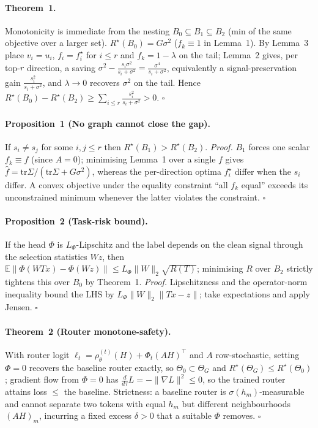 \documentclass[letterpaper]{article}
\begin{document}
\paragraph{Theorem~1.} Monotonicity is immediate from the nesting $B_0\subseteq B_1\subseteq B_2$
(min of the same objective over a larger set). $R^\star(B_0)=G\sigma^2$ ($f_k\equiv1$ in
Lemma~1). By Lemma~3 place $v_i{=}u_i$, $f_i{=}f_i^\star$ for $i\le r$ and $f_k{=}1-\lambda$ on the
tail; Lemma~2 gives, per top-$r$ direction, a saving
$\sigma^2-\frac{s_i\sigma^2}{s_i+\sigma^2}=\frac{\sigma^4}{s_i+\sigma^2}$, equivalently a
signal-preservation gain $\frac{s_i^2}{s_i+\sigma^2}$, and $\lambda\to0$ recovers $\sigma^2$ on the
tail. Hence $R^\star(B_0)-R^\star(B_2)\ge\sum_{i\le r}\frac{s_i^2}{s_i+\sigma^2}>0$. $\square$

\paragraph{Proposition~1 (No graph cannot close the gap).} If $s_i\ne s_j$ for some $i,j\le r$
then $R^\star(B_1)>R^\star(B_2)$. \emph{Proof.} $B_1$ forces one scalar $f_k\equiv f$ (since
$A{=}0$); minimising Lemma~1 over a single $f$ gives $\hat f=\mathrm{tr}\Sigma/(\mathrm{tr}\Sigma+G\sigma^2)$,
whereas the per-direction optima $f_i^\star$ differ when the $s_i$ differ. A convex objective under
the equality constraint ``all $f_k$ equal'' exceeds its unconstrained minimum whenever the latter
violates the constraint. $\square$

\paragraph{Proposition~2 (Task-risk bound).} If the head $\Phi$ is $L_\Phi$-Lipschitz and the label
depends on the clean signal through the selection statistics $Wz$, then
$\mathbb{E}\lVert\Phi(WTx)-\Phi(Wz)\rVert\le L_\Phi\lVert W\rVert_2\sqrt{R(T)}$; minimising $R$ over
$B_2$ strictly tightens this over $B_0$ by Theorem~1. \emph{Proof.} Lipschitzness and the
operator-norm inequality bound the LHS by $L_\Phi\lVert W\rVert_2\lVert Tx-z\rVert$; take
expectations and apply Jensen. $\square$

\paragraph{Theorem~2 (Router monotone-safety).} With router logit
$\ell_t=\rho_\theta^{(t)}(H)+\Phi_t(AH)^\top$ and $A$ row-stochastic, setting $\Phi{=}0$ recovers
the baseline router exactly, so $\Theta_0\subset\Theta_G$ and $R^\star(\Theta_G)\le R^\star(\Theta_0)$;
gradient flow from $\Phi{=}0$ has $\tfrac{d}{d\tau}L=-\lVert\nabla L\rVert^2\le0$, so the trained
router attains loss $\le$ the baseline. Strictness: a baseline router is $\sigma(h_m)$-measurable
and cannot separate two tokens with equal $h_m$ but different neighbourhoods $(AH)_m$, incurring a
fixed excess $\delta>0$ that a suitable $\Phi$ removes. $\square$
\end{document}
